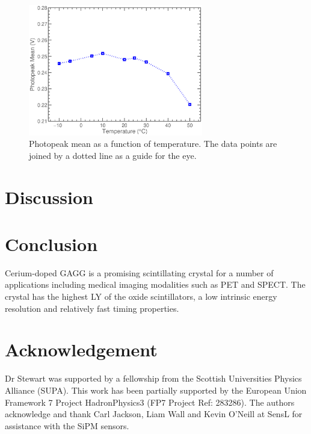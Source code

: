 \documentclass[journal]{IEEEtran}
\begin{document}
\begin{figure}[tb]
\centering
\includegraphics[width=3in]{photopeak_temp.eps}
\caption{Photopeak mean as a function of temperature. The data points are joined by a dotted line as a guide for the eye.}
\label{fig:photopeak_temp}
\end{figure}





\section{Discussion}

\section{Conclusion}

Cerium-doped GAGG is a promising scintillating crystal for a number of applications including medical imaging modalities such as PET and SPECT. The crystal has the highest LY of the oxide scintillators, a low intrinsic energy resolution and relatively fast timing properties. 


\section*{Acknowledgement}
%
Dr Stewart was supported by a fellowship from the \mbox{Scottish} Universities Physics Alliance (SUPA). This work has been partially supported by the European Union Framework 7 Project HadronPhysics3 (FP7 Project Ref: 283286). The authors acknowledge and thank Carl Jackson, Liam Wall and Kevin O'Neill at SensL for assistance with the SiPM sensors. 
\end{document}
